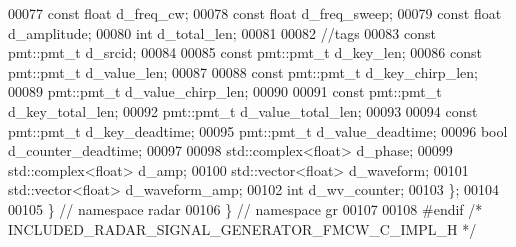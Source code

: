 \begin{DoxyCode}
00077       \textcolor{keyword}{const} \textcolor{keywordtype}{float} d_freq_cw; 
00078       \textcolor{keyword}{const} \textcolor{keywordtype}{float} d_freq_sweep; 
00079       \textcolor{keyword}{const} \textcolor{keywordtype}{float} d_amplitude; 
00080       \textcolor{keywordtype}{int} d_total_len;
00081 
00082       \textcolor{comment}{//tags}
00083       \textcolor{keyword}{const} pmt::pmt\_t d_srcid; 
00084 
00085       \textcolor{keyword}{const} pmt::pmt\_t d_key_len; 
00086       \textcolor{keyword}{const} pmt::pmt\_t d_value_len; 
00087 
00088       \textcolor{keyword}{const} pmt::pmt\_t d_key_chirp_len; 
00089       pmt::pmt\_t d_value_chirp_len; 
00090 
00091       \textcolor{keyword}{const} pmt::pmt\_t d_key_total_len; 
00092       pmt::pmt\_t d_value_total_len; 
00093 
00094       \textcolor{keyword}{const} pmt::pmt\_t d_key_deadtime; 
00095       pmt::pmt\_t d_value_deadtime; 
00096       \textcolor{keywordtype}{bool} d_counter_deadtime;
00097 
00098       std::complex<float> d_phase; 
00099       std::complex<float> d_amp;
00100       std::vector<float> d_waveform; 
00101       std::vector<float> d_waveform_amp; 
00102       \textcolor{keywordtype}{int} d_wv_counter; 
00103     \};
00104 
00105   \} \textcolor{comment}{// namespace radar}
00106 \} \textcolor{comment}{// namespace gr}
00107 
00108 \textcolor{preprocessor}{#endif }\textcolor{comment}{/* INCLUDED\_RADAR\_SIGNAL\_GENERATOR\_FMCW\_C\_IMPL\_H */}\textcolor{preprocessor}{}
\end{DoxyCode}
